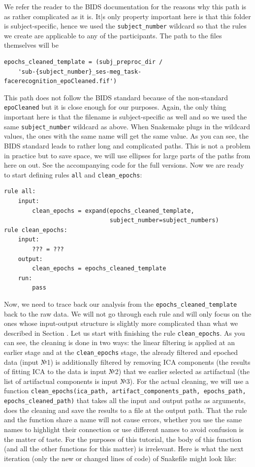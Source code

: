 \documentclass[a4paper,man,floatsintext,natbib]{apa6}
\begin{document}
We refer the reader to the BIDS documentation for the reasons why this path is as rather complicated as it is. It|s only property important here is that this folder is subject-specific, hence we used the \verb|subject_number| wildcard so that the rules we create are applicable to any of the participants. The path to the files themselves will be

\begin{verbatim}
epochs_cleaned_template = (subj_preproc_dir /
    'sub-{subject_number}_ses-meg_task-facerecognition_epoCleaned.fif')
\end{verbatim}

This path does not follow the BIDS standard because of the non-standard \verb|epoCleaned| but it is close enough for our purposes. Again, the only thing important here is that the filename is subject-specific as well and so we used the same \verb|subject_number| wildcard as above. When Snakemake plugs in the wildcard values, the ones with the same name will get the same value. As you can see, the BIDS standard leads to rather long and complicated paths. This is not a problem in practice but to save space, we will use ellipses for large parts of the paths from here on out. See the accompanying code for the full versions. Now we are ready to start defining rules \verb|all| and \verb|clean_epochs|:

\begin{verbatim}
rule all:
    input:
        clean_epochs = expand(epochs_cleaned_template,
                              subject_number=subject_numbers)
rule clean_epochs:
    input:
        ??? = ???
    output:
        clean_epochs = epochs_cleaned_template
    run:
        pass
\end{verbatim}

Now, we need to trace back our analysis from the \verb|epochs_cleaned_template| back to the raw data. We will not go through each rule and will only focus on the ones whose input-output structure is slightly more complicated than what we described in Section . Let us start with finishing the rule \verb|clean_epochs|. As you can see, the cleaning is done in two ways: the linear filtering is applied at an earlier stage and at the \verb|clean_epochs| stage, the already filtered and epoched data (input №1) is additionally filtered by removing ICA components (the results of fitting ICA to the data is input №2) that we earlier selected as artifactual (the list of artifactual components is input №3). For the actual cleaning, we will use a function \lstinline[breaklines]|clean_epochs(ica_path, artifact_components_path, epochs_path, epochs_cleaned_path)| that takes all the input and output paths as arguments, does the cleaning and save the results to a file at the output path. That the rule and the function share a name will not cause errors, whether you use the same names to highlight their connection or use different names to avoid confusion is the matter of taste. For the purposes of this tutorial, the body of this function (and all the other functions for this matter) is irrelevant. Here is what the next iteration (only the new or changed lines of code) of Snakefile might look like:
\end{document}
